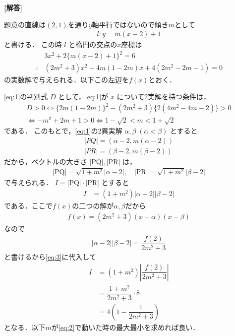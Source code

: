 \documentclass[../../main.tex]{subfiles}
\begin{document}
\begin{oframed}
  
\end{oframed}

{\bf [解答]}

題意の直線は$(2,1)$を通り$y$軸平行ではないので傾き$m$として
\begin{align}
  l : y = m(x-2) + 1
\end{align}
と書ける．
この時 $l$ と楕円の交点の$x$座標は
\begin{align}
  & 3x^2 + 2 \{ m(x-2) + 1 \}^2 = 6　\\
  \therefore
  & (2m^2+3)x^2 + 4m(1-2m)x + 4(2m^2-2m-1) = 0 \label{eq:1}
\end{align}
の実数解で与えられる．以下この左辺を$f(x)$とおく．

\cref{eq:1}の判別式 $D$ として，\cref{eq:1}が $x$ について2実解を持つ条件は，
\begin{align}
  D > 0 \iff \{ 2m(1-2m) \}^2 - (2m^2+3) \{ 2(4m^2-4m-2) \} > 0 \\
  \iff -m^2+2m+1 > 0 \iff 1-\sqrt{2} < m < 1+\sqrt{2} \label{eq:2}
\end{align}
である．
このもとで，\cref{eq:1}の2異実解 $\alpha, \beta \; (\alpha < \beta)$ とすると
\begin{align}
  |PQ| = (\alpha-2, m(\alpha-2))\\
  |PR| = (\beta-2, m(\beta-2))
\end{align}
だから，ベクトルの大きさ $|\text{PQ}|, |\text{PR}|$ は，
\begin{align}
  |\text{PQ}| = \sqrt{1+m^2}|\alpha-2|, \quad |\text{PR}| = \sqrt{1+m^2}|\beta-2|
\end{align}
で与えられる． $I = |\text{PQ}| \cdot |\text{PR}|$ とすると
\begin{align}
  I &= (1+m^2)|\alpha-2||\beta-2| \label{eq:3}
\end{align}
である．ここで$f(x)$の二つの解が$\alpha,\beta$だから
\begin{align}
  f(x) = (2m^2+3)(x-\alpha)(x-\beta)
\end{align}
なので
\begin{align}
  |\alpha-2||\beta-2| = \dfrac{f(2)}{2m^2+3}
\end{align}
と書けるから\cref{eq:3}に代入して
\begin{align}
  I
  &= (1+m^2)\left| \dfrac{f(2)}{2m^2+3} \right| \\
  &= \dfrac{1+m^2}{2m^2+3} \cdot 8 \\
  &= 4 \left( 1 - \dfrac{1}{2m^2+3} \right)  \label{eq:4}
\end{align}
となる．以下$m$が\cref{eq:2}で動いた時の最大最小を求めれば良い．
\end{document}
